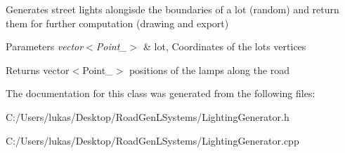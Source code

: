 Generates street lights alongisde the boundaries of a lot (random) and return them for further computation (drawing and export)


\begin{DoxyParams}{Parameters}
{\em vector$<$\+Point\+\_$>$} & lot, Coordinates of the lots vertices\\
\hline
\end{DoxyParams}
\begin{DoxyReturn}{Returns}
vector$<$\+Point\+\_$>$ positions of the lamps along the road 
\end{DoxyReturn}


The documentation for this class was generated from the following files\+:\begin{DoxyCompactItemize}
\item 
C\+:/\+Users/lukas/\+Desktop/\+Road\+Gen\+L\+Systems/Lighting\+Generator.\+h\item 
C\+:/\+Users/lukas/\+Desktop/\+Road\+Gen\+L\+Systems/Lighting\+Generator.\+cpp\end{DoxyCompactItemize}
